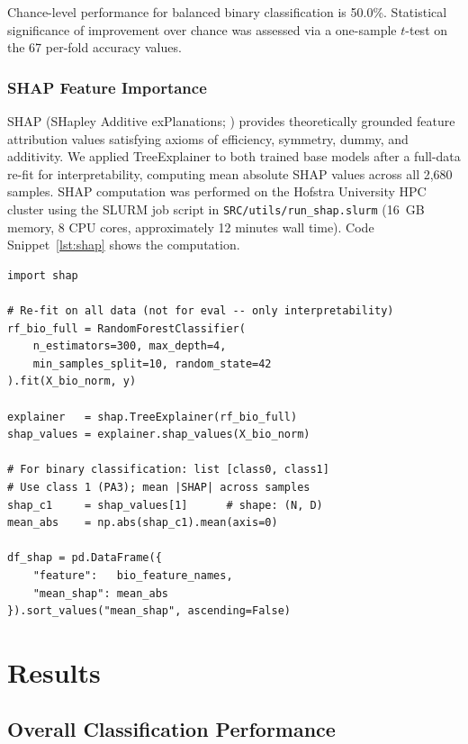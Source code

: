 \documentclass[10pt, twocolumn]{article}
\begin{document}
Chance-level performance for balanced binary classification is 50.0\%. Statistical
significance of improvement over chance was assessed via a one-sample $t$-test on the 67
per-fold accuracy values.

\subsubsection{SHAP Feature Importance}

SHAP (SHapley Additive exPlanations; \cite{Lundberg2017}) provides theoretically grounded
feature attribution values satisfying axioms of efficiency, symmetry, dummy, and additivity.
We applied TreeExplainer to both trained base models after a full-data re-fit for
interpretability, computing mean absolute SHAP values across all 2,680 samples. SHAP
computation was performed on the Hofstra University HPC cluster using the SLURM job
script in \texttt{SRC/utils/run\_shap.slurm} (16~GB memory, 8 CPU cores, approximately
12 minutes wall time).
Code Snippet~\ref{lst:shap} shows the computation.

\begin{lstlisting}[caption={SHAP TreeExplainer applied to the biosignal Random Forest. The same procedure applies to the landmark RF.}, label={lst:shap}]
import shap

# Re-fit on all data (not for eval -- only interpretability)
rf_bio_full = RandomForestClassifier(
    n_estimators=300, max_depth=4,
    min_samples_split=10, random_state=42
).fit(X_bio_norm, y)

explainer   = shap.TreeExplainer(rf_bio_full)
shap_values = explainer.shap_values(X_bio_norm)

# For binary classification: list [class0, class1]
# Use class 1 (PA3); mean |SHAP| across samples
shap_c1     = shap_values[1]      # shape: (N, D)
mean_abs    = np.abs(shap_c1).mean(axis=0)

df_shap = pd.DataFrame({
    "feature":   bio_feature_names,
    "mean_shap": mean_abs
}).sort_values("mean_shap", ascending=False)
\end{lstlisting}

\section{Results}
\label{sec:results}

\subsection{Overall Classification Performance}
\end{document}
